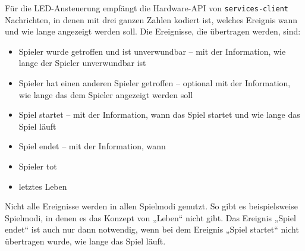 Für die LED-Ansteuerung empfängt die Hardware-API von \texttt{services-client} Nachrichten, in denen
mit drei ganzen Zahlen kodiert ist, welches Ereignis wann und wie lange angezeigt werden soll.
Die Ereignisse, die übertragen werden, sind:
\begin{itemize}
  \item
    Spieler wurde getroffen und ist unverwundbar – mit der Information, wie lange der Spieler
    unverwundbar ist
  \item
    Spieler hat einen anderen Spieler getroffen – optional mit der Information, wie lange das dem
    Spieler angezeigt werden soll
  \item
    Spiel startet – mit der Information, wann das Spiel startet und wie lange das Spiel läuft
  \item
    Spiel endet – mit der Information, wann
  \item
    Spieler tot
  \item
    letztes Leben
\end{itemize}
Nicht alle Ereignisse werden in allen Spielmodi genutzt.
So gibt es beispielsweise Spielmodi, in denen es das Konzept von „Leben“ nicht gibt.
Das Ereignis „Spiel endet“ ist auch nur dann notwendig, wenn bei dem Ereignis „Spiel startet“ nicht
übertragen wurde, wie lange das Spiel läuft.

